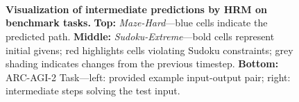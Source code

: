 \begin{figure}[t]
  \centering
  \\
  \\
  \\
  \caption{\textbf{Visualization of intermediate predictions by HRM on benchmark tasks.} \textbf{Top:} \textit{Maze-Hard}—blue cells indicate the predicted path. \textbf{Middle:} \textit{Sudoku-Extreme}—bold cells represent initial givens; red highlights cells violating Sudoku constraints; grey shading indicates changes from the previous timestep.
  \textbf{Bottom:} ARC-AGI-2 Task—left: provided example input-output pair; right: intermediate steps solving the test input.}
  \label{fig:visualization}
\end{figure}